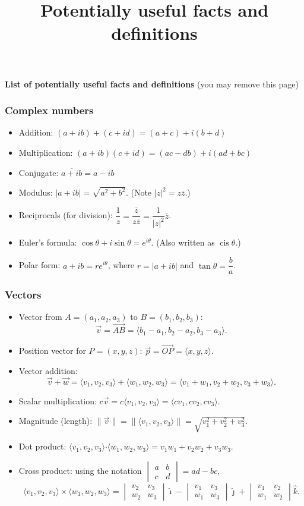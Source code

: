 \documentclass[letterpaper,8pt,landscape]{article}
\title{Potentially useful facts and definitions}
\author{}
\newcommand{\dotp}{\boldsymbol{\cdot}}
\newcommand{\abs}[1]{\lvert #1\rvert}
\newcommand{\len}[1]{\lVert #1\rVert}
\newcommand{\bvm}{\begin{vmatrix}}
\newcommand{\evm}{\end{vmatrix}}
\begin{document}
\begin{center}
{\bf List of potentially useful facts and definitions} (you may remove this page)
\end{center}
\begin{multicols}{2}
\subsubsection*{Complex numbers}
\begin{itemize}
 \item Addition: $(a+ib)+(c+id) = (a+c)+i(b+d)$
 \item Multiplication: $(a+ib)(c+id) = (ac-db)+i(ad+bc)$
 \item Conjugate: $\overline{a+ib} = a-ib$
 \item Modulus: $\abs{a+ib} = \sqrt{a^2+b^2}$. (Note $\abs{z}^2 = z\overline{z}$.)
 \item Reciprocals (for division): $\dfrac{1}{z} = \dfrac{\overline{z}}{z\overline{z}} = \dfrac{1}{\abs{z}^2}\overline{z}$.
 \item Euler's formula: $\cos\theta+i\sin\theta = e^{i\theta}$. (Also written as $\operatorname{cis}\theta$.)
 \item Polar form: $a+ib = re^{i\theta}$, where $r=\abs{a+ib}$ and $\tan\theta = \dfrac{b}{a}$.
\end{itemize}
\subsubsection*{Vectors}
\begin{itemize}
 \item Vector from $A=(a_1,a_2,a_3)$ to $B=(b_1,b_2,b_3)$: 
 \[
 \vec{v} = \overrightarrow{AB} = \langle b_1-a_1, b_2-a_2, b_3-a_3\rangle.
 \]
 \item Position vector for $P=(x,y,z)$: $\vec{p} = \overrightarrow{OP} = \langle x,y,z\rangle$.
 \item Vector addition: 
\[
\vec{v}+\vec{w} = \langle v_1,v_2,v_3\rangle + \langle w_1,w_2,w_3\rangle = \langle v_1+w_1,v_2+w_2,v_3+w_3\rangle. 
\]
 \item Scalar multiplication: $c\vec{v} = c\langle v_1,v_2,v_3\rangle = \langle cv_1,cv_2,cv_3\rangle$.
 \item Magnitude (length): $\len{\vec{v}} = \len{\langle v_1,v_2,v_3\rangle} = \sqrt{v_1^2+v_2^2+v_3^2}$.
 \item Dot product: $\langle v_1,v_2,v_3\rangle\dotp \langle w_1,w_2,w_3\rangle = v_1w_1+v_2w_2+v_3w_3$.
 \item Cross product: using the notation $\bvm a&b\\c&d\evm = ad-bc$,
\[\langle v_1,v_2,v_3\rangle\times \langle w_1,w_2,w_3\rangle = \bvm v_2&v_3\\w_2&w_3\evm \hat{\imath} - \bvm v_1&v_3\\w_1&w_3\evm\hat{\jmath} + \bvm v_1&v_2\\w_1&w_2\evm\hat{k}.
\]


\end{itemize}
\end{multicols}
\end{document}
